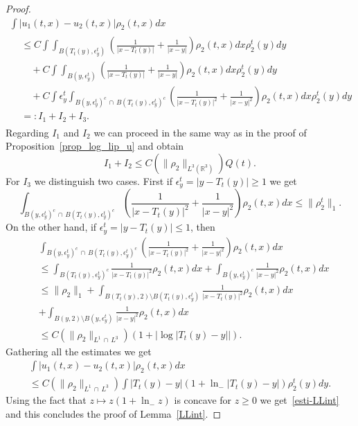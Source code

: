 \documentclass[10pt]{amsart}
\theoremstyle{definition}\newtheorem{defi}[theo]{Definition}\newtheorem{rema}[theo]{Remark}\newtheorem{exam}[theo]{Example}\newtheorem{exem}[theo]{Example}\newtheorem{nota}[theo]{Notation}
\newcommand{\R}{\mathbb{R}}
\renewcommand{\leq}{\leqslant}
\renewcommand{\geq}{\geqslant}
\begin{document}
\begin{proof}
\begin{multline*}
\int|u_1(t,x)-u_2(t,x)|\rho_2(t,x)dx\\
\begin{aligned}
&\leq C \int \int_{B\left(T_t (y),\epsilon_y^t\right)} \left(\frac{1}{|x-T_t (y) |}+\frac{1}{|x-y|} \right)\rho_2(t,x) dx \rho_2^t(y) dy\\
&\quad + C \int \int_{B\left(y,\epsilon_y^t\right)} \left(\frac{1}{|x-T_t (y)|}+\frac{1}{|x-y|} \right)\rho_2(t,x) dx \rho_2^t(y) dy\\
&\quad +C \int \epsilon_y^t \int_{B\left(y,\epsilon_y^t\right)^c\, \cap\, B\left(T_t (y),\epsilon_y^t\right)^c} \left(\frac{1}{|x-T_t (y)|^2}+\frac{1}{|x-y|^2} \right)\rho_2(t,x) dx \rho_2^t(y) dy\\
&=: I_1+I_2+I_3.
\end{aligned}
\end{multline*}
Regarding $I_1$ and $I_2$ we can proceed in the same way as in the proof of Proposition~\ref{prop_log_lip_u} and obtain
\begin{equation*}
I_1 +I_2\leq C(\|\rho_2\|_{L^3 \left(\R^3\right)}) Q(t).
\end{equation*}
For $I_3$ we distinguish two cases. First if $\epsilon_y^t=|y-T_t (y)|\geq 1 $ we get
\[
\int_{B\left(y,\epsilon_y^t\right)^c\,\cap\,B\left(T_t (y),\epsilon_y^t\right)^c} \left(\frac{1}{|x-T_t (y)|^2}+\frac{1}{|x-y|^2} \right)\rho_2(t,x) dx \leq \|\rho_2^t\|_1.
\]
On the other hand, if $\epsilon_y^t=|y-T_t (y)|\leq 1 $, then
\begin{align*}
&\int_{B\left(y,\epsilon_y^t\right)^c\,\cap\, B\left(T_t (y),\epsilon_y^t\right)^c} \left(\frac{1}{|x-T_t (y)|^2}+\frac{1}{|x-y|^2} \right)\rho_2(t,x) dx \\
&\leq \int_{B(T_t (y),\epsilon_y^t)^c } \frac{1}{|x-T_t (y)|^2}\rho_2(t,x)dx + \int_{B\left(y,\epsilon_y^t\right)^c } \frac{1}{|x-y|^2}\rho_2(t,x)dx\\
& \leq\|\rho_2\|_1+ \int_{B\left(T_t (y),2\right)\setminus B\left(T_t (y),\epsilon_y^t\right) } \frac{1}{|x-T_t (y)|^2}\rho_2(t,x)dx\\
&+ \int_{B(y,2)\setminus B\left(y,\epsilon_y^t\right)} \frac{1}{|x-y|^2}\rho_2(t,x)dx\\
&\leq C(\|\rho_2\|_{L^1\,\cap\,L^3})(1+ |\log|T_t (y) -y||).
\end{align*}
Gathering all the estimates we get
\begin{multline*}
\int|u_1(t,x)-u_2(t,x)|\rho_2(t,x)dx \\
\leq C(\|\rho_2\|_{L^1\,\cap\,L^3}) \int |T_t (y) - y |(1+ \ln_{-}|T_t (y) - y |) \rho_2^t(y) dy.
\end{multline*}
Using the fact that $z\mapsto z(1+\ln_{-} z)$ is concave for $z\geq 0$ we get~\eqref{esti-LLint} and this concludes the proof of Lemma~\ref{LLint}.
\end{proof}
\end{document}
